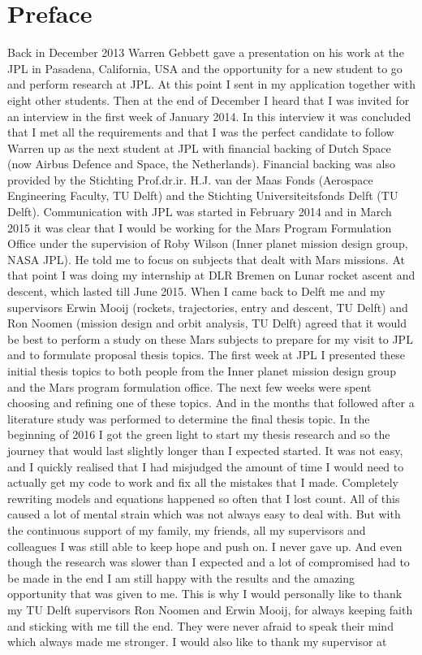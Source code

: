 \chapter*{Preface} 

Back in December 2013 Warren Gebbett gave a presentation on his work at the \ac{JPL} in Pasadena, California, USA and the opportunity for a new student to go and perform research at \ac{JPL}. At this point I sent in my application together with eight other students.  Then at the end of December I heard that I was invited for an interview in the first week of January 2014. In this interview it was concluded that I met all the requirements and that I was the perfect candidate to follow Warren up as the next student at \ac{JPL} with financial backing of Dutch Space (now Airbus Defence and Space, the Netherlands). Financial backing was also provided by the Stichting Prof.dr.ir. H.J. van der Maas Fonds (Aerospace Engineering Faculty, TU Delft) and the Stichting Universiteitsfonds Delft (TU Delft). Communication with \ac{JPL} was started in February 2014 and in March 2015 it was clear that I would be working for the Mars Program Formulation Office under the supervision of Roby Wilson (Inner planet mission design group, NASA \ac{JPL}). He told me to focus on subjects that dealt with Mars missions. At that point I was doing my internship at DLR Bremen on Lunar rocket ascent and descent, which lasted till June 2015. When I came back to Delft me and my supervisors Erwin Mooij (rockets, trajectories, entry and descent, TU Delft) and Ron Noomen (mission design and orbit analysis, TU Delft) agreed that it would be best to perform a study on these Mars subjects to prepare for my visit to \ac{JPL} and to formulate proposal thesis topics. The first week at \ac{JPL} I presented these initial thesis topics to both people from the Inner planet mission design group and the Mars program formulation office. The next few weeks were spent choosing and refining one of these topics. And in the months that followed after a literature study was performed to determine the final thesis topic. In the beginning of 2016 I got the green light to start my thesis research and so the journey that would last slightly longer than I expected started. It was not easy, and I quickly realised that I had misjudged the amount of time I would need to actually get my code to work and fix all the mistakes that I made. Completely rewriting models and equations happened so often that I lost count. All of this caused a lot of mental strain which was not always easy to deal with. But with the continuous support of my family, my friends, all my supervisors and colleagues I was still able to keep hope and push on. I never gave up. And even though the research was slower than I expected and a lot of compromised had to be made in the end I am still happy with the results and the amazing opportunity that was given to me. This is why I would personally like to thank my TU Delft supervisors Ron Noomen and Erwin Mooij, for always keeping faith and sticking with me till the end. They were never afraid to speak their mind which always made me stronger. I would also like to thank my supervisor at 